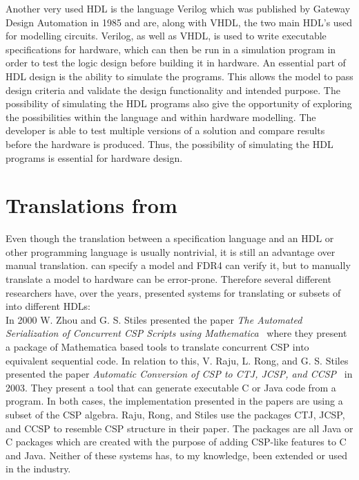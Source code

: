 Another very used HDL is the language Verilog which was published by Gateway Design Automation in 1985 and are, along with VHDL, the two main HDL's used for modelling circuits.
Verilog, as well as VHDL, is used to write executable specifications for hardware, which can then be run in a simulation program in order to test the logic design before building it in hardware. An essential part of HDL design is the ability to simulate the programs. This allows the model to pass design criteria and validate the design functionality and intended purpose. The possibility of simulating the HDL programs also give the opportunity of exploring the possibilities within the language and within hardware modelling. The developer is able to test multiple versions of a solution and compare results before the hardware is produced. Thus, the possibility of simulating the HDL programs is essential for hardware design.
\section{Translations from \cspm{}}
Even though the translation between a specification language and an HDL or other programming language is usually nontrivial, it is still an advantage over manual translation.
\cspm{} can specify a model and FDR4 can verify it, but to manually translate a model to hardware can be error-prone. Therefore several different researchers have, over the years, presented systems for translating \cspm{} or subsets of \cspm{} into different HDLs:\\

In 2000 W. Zhou and G. S. Stiles presented the paper \textit{The Automated Serialization of Concurrent CSP Scripts using Mathematica}~\cite{Zhou2000} where they present a package of Mathematica based tools to translate concurrent CSP into equivalent sequential code.
In relation to this, V. Raju, L. Rong, and G. S. Stiles presented the paper \textit{Automatic Conversion of CSP to CTJ, JCSP, and CCSP}~\cite{Raju2003} in 2003. They present a tool that can generate executable C or Java code from a \cspm{} program. In both cases, the implementation presented in the papers are using a subset of the CSP algebra. Raju,
Rong, and Stiles use the packages CTJ, JCSP, and CCSP to resemble CSP structure in their paper. The packages are all Java or C packages which are created with the purpose of adding CSP-like features to C and Java. Neither of these systems has, to my knowledge, been extended or used in the industry.\\


